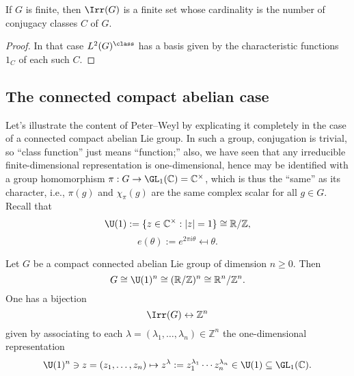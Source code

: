 \documentclass[reqno]{amsart} 
\begin{document}
\begin{corollary}
  If $G$ is finite, then $\Irr(G)$ is a finite set whose cardinality is the number of conjugacy classes $C$ of $G$.
\end{corollary}
\begin{proof}
  In that case $L^2(G)^{\class}$ has a basis given by the characteristic functions $1_C$ of each such $C$.
\end{proof}

\subsection{The connected compact abelian case}\label{sec:conn-comp-abel}
Let's illustrate the content of Peter--Weyl by explicating it completely in the case of a connected compact abelian Lie group.  In such a group, conjugation is trivial, so ``class function'' just means ``function;'' also, we have seen that any irreducible finite-dimensional representation is one-dimensional, hence may be identified with a group homomorphism $\pi : G \rightarrow \GL_1(\mathbb{C}) = \mathbb{C}^\times$, which is thus the ``same'' as its character, i.e., $\pi(g)$ and $\chi_\pi(g)$ are the same complex scalar for all $g \in G$.  Recall that
\begin{equation*}
  \U(1) := \{z \in \mathbb{C}^\times : |z| = 1\} \cong \mathbb{R}/\mathbb{Z},
\end{equation*}
\begin{equation*}
  e(\theta) := e^{2 \pi i \theta} \mapsfrom \theta.
\end{equation*}
\begin{lemma}\label{lem:reps-of-tori}
  Let $G$ be a compact connected abelian Lie group of dimension $n \geq 0$.  Then
  \begin{equation*}
    G \cong \U(1)^n \cong (\mathbb{R}/\mathbb{Z})^n \cong \mathbb{R}^n/\mathbb{Z}^n.
  \end{equation*}
  One has a bijection
  \begin{equation*}
    \Irr(G) \leftrightarrow \mathbb{Z}^n
  \end{equation*}
  given by associating to each $\lambda = (\lambda_1,\dotsc,\lambda_n) \in \mathbb{Z}^n$ the one-dimensional representation
  \begin{equation}\label{eq:defn-char-of-U1-to-the-n}
    \U(1)^n
    \ni z = (z_1,\dotsc,z_n)
    \mapsto z^{\lambda} :=
    z_1^{\lambda_1} \dotsb z_n^{\lambda_n}
    \in \U(1) \subseteq \GL_1(\mathbb{C}).
  \end{equation}
\end{lemma}
\end{document}
